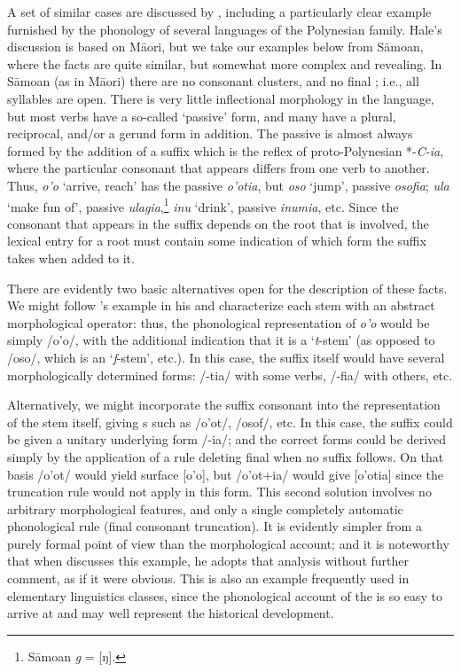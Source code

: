 A set of similar cases are discussed by \citet{hale73:lardil},
including a particularly clear example furnished by the phonology of
several languages of the Polynesian family. Hale's discussion is based
on Māori, but we take our examples below from Sāmoan, where the facts
are quite similar, but somewhat more complex and revealing.  In Sāmoan
(as in Māori) there are no consonant clusters, and no final
; i.e., all syllables are open. There is very little
inflectional morphology in the language, but most verbs have a
so-called `passive' form, and many have a plural, reciprocal, and/or a
gerund form in addition. The passive is almost always formed by the
addition of a suffix which is the reflex of proto-Polynesian
*-\emph{C-ia}, where the particular consonant that appears differs from
one verb to another. Thus, \emph{o'o} `arrive, reach' has the passive
\emph{o'otia}, but \emph{oso} `jump', passive \emph{osofia};
\emph{ula} `make fun of', passive \emph{ulagia},\footnote{Sāmoan
  \emph{g} = [ŋ].} \emph{inu} `drink', passive \emph{inumia},
etc. Since the consonant that appears in the suffix depends on the
root that is involved, the lexical entry for a root must contain some
indication of which form the suffix takes when added to it.

There are evidently two basic alternatives open for the description of
these facts. We might follow {\Sapir}'s example in his 
and characterize each stem with an abstract morphological operator:
thus, the phonological representation of \emph{o'o} would be simply /o'o/,
with the additional indication that it is a `\emph{t}-stem' (as opposed to
/oso/, which is an `\emph{f}-stem', etc.). In this case, the suffix itself
would have several morphologically determined forms: /-tia/ with some
verbs, /-fia/ with others, etc.

Alternatively, we might incorporate the suffix consonant into the
representation of the stem itself, giving s
such as /o'ot/, /osof/, etc. In this case, the suffix could be given a
unitary underlying form /-ia/; and the correct forms could be derived
simply by the application of a rule deleting final  when no
suffix follows. On that basis /o'ot/ would yield surface [o'o], but
/o'ot+ia/ would give [o'otia] since the truncation rule would not
apply in this form. This second solution involves no arbitrary
morphological features, and only a single completely automatic
phonological rule (final consonant truncation). It is evidently
simpler from a purely formal point of view than the morphological
account; and it is noteworthy that when \citet[219]{bloomfield:lg}
discusses this example, he adopts that analysis without further
comment, as if it were obvious. This is also an example frequently
used in elementary linguistics classes, since the phonological account
of the  is so easy to arrive at and may well represent the 
historical development.

